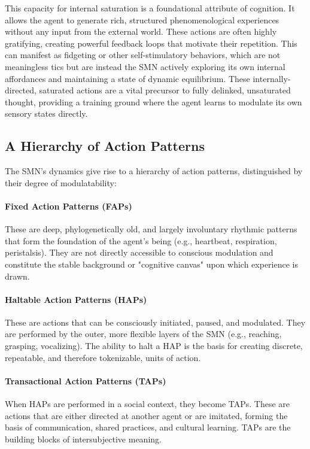 This capacity for internal saturation is a foundational attribute of cognition. It allows the agent to generate rich, structured phenomenological experiences without any input from the external world. These actions are often highly gratifying, creating powerful feedback loops that motivate their repetition. This can manifest as fidgeting or other self-stimulatory behaviors, which are not meaningless tics but are instead the SMN actively exploring its own internal affordances and maintaining a state of dynamic equilibrium. These internally-directed, saturated actions are a vital precursor to fully delinked, unsaturated thought, providing a training ground where the agent learns to modulate its own sensory states directly.

\subsection{A Hierarchy of Action Patterns}
\label{subsec:hierarchy}
The SMN's dynamics give rise to a hierarchy of action patterns, distinguished by their degree of modulatability:
\paragraph{Fixed Action Patterns (FAPs)} These are deep, phylogenetically old, and largely involuntary rhythmic patterns that form the foundation of the agent's being (e.g., heartbeat, respiration, peristalsis). They are not directly accessible to conscious modulation and constitute the stable background or "cognitive canvas" upon which experience is drawn.

\paragraph{Haltable Action Patterns (HAPs)} These are actions that can be consciously initiated, paused, and modulated. They are performed by the outer, more flexible layers of the SMN (e.g., reaching, grasping, vocalizing). The ability to halt a HAP is the basis for creating discrete, repeatable, and therefore tokenizable, units of action.

\paragraph{Transactional Action Patterns (TAPs)} When HAPs are performed in a social context, they become TAPs. These are actions that are either directed at another agent or are imitated, forming the basis of communication, shared practices, and cultural learning. TAPs are the building blocks of intersubjective meaning.

